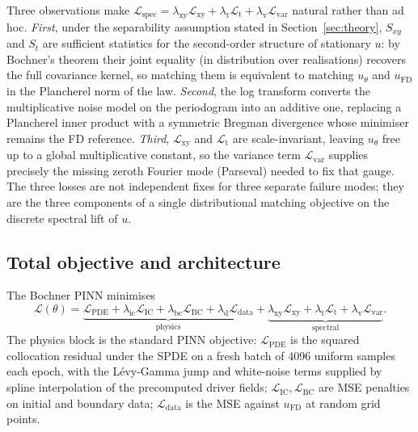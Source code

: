 \documentclass[review,12pt]{elsarticle}
\begin{document}
Three observations make
\(\mathcal{L}_{\mathrm{spec}} =
\lambda_{\mathrm{xy}} \mathcal L_{\mathrm{xy}}
+ \lambda_{\mathrm{t}} \mathcal L_{\mathrm{t}}
+ \lambda_{\mathrm{v}} \mathcal L_{\mathrm{var}}\)
natural rather than ad hoc. \emph{First}, under the separability
assumption stated in Section~\ref{sec:theory}, \(S_{xy}\) and
\(S_t\) are sufficient statistics for the second-order structure
of stationary \(u\): by Bochner's theorem their joint equality (in
distribution over realisations) recovers the full covariance
kernel, so matching them is equivalent to matching \(u_\theta\)
and \(u_{\mathrm{FD}}\) in the Plancherel norm of the law.
\emph{Second}, the log transform converts the multiplicative noise
model on the periodogram into an additive one, replacing a
Plancherel inner product with a symmetric Bregman divergence
whose minimiser remains the FD reference. \emph{Third},
\(\mathcal L_{\mathrm{xy}}\) and \(\mathcal L_{\mathrm{t}}\) are
scale-invariant, leaving \(u_\theta\) free up to a global
multiplicative constant, so the variance term
\(\mathcal L_{\mathrm{var}}\) supplies precisely the missing
zeroth Fourier mode (Parseval) needed to fix that gauge. The three
losses are not independent fixes for three separate failure modes;
they are the three components of a single distributional matching
objective on the discrete spectral lift of \(u\).

\subsection{Total objective and architecture}
\label{subsec:total-objective}

The Bochner PINN minimises
\begin{equation}
\mathcal{L}(\theta) =
\underbrace{\mathcal L_{\mathrm{PDE}}
+ \lambda_{\mathrm{ic}} \mathcal L_{\mathrm{IC}}
+ \lambda_{\mathrm{bc}} \mathcal L_{\mathrm{BC}}
+ \lambda_{\mathrm d} \mathcal L_{\mathrm{data}}}_{\text{physics}}
+ \underbrace{\lambda_{\mathrm{xy}} \mathcal L_{\mathrm{xy}}
+ \lambda_{\mathrm t} \mathcal L_{\mathrm t}
+ \lambda_{\mathrm v} \mathcal L_{\mathrm{var}}}_{\text{spectral}}.
\label{eq:total-loss}
\end{equation}
The physics block is the standard PINN objective:
\(\mathcal L_{\mathrm{PDE}}\) is the squared collocation residual
under the SPDE on a fresh batch of 4096 uniform samples each epoch,
with the L\'evy-Gamma jump and white-noise terms supplied by spline
interpolation of the precomputed driver fields;
\(\mathcal L_{\mathrm{IC}}, \mathcal L_{\mathrm{BC}}\) are MSE
penalties on initial and boundary data; \(\mathcal L_{\mathrm{data}}\)
is the MSE against \(u_{\mathrm{FD}}\) at random grid points.
\end{document}
